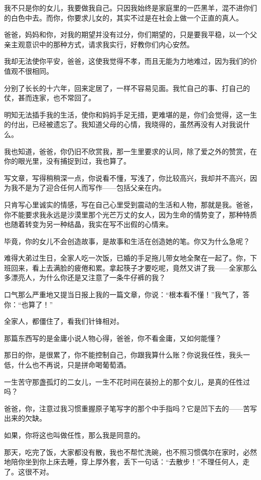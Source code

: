 \par 我不只是你的女儿，我要做我自己。只因我始终是家庭里的一匹黑羊，混不进你们的白色中去。而你，你要求儿女的，其实不过是在社会上做一个正直的真人。
\par 爸爸，妈妈和你，对我的期望并没有过分，你们期望的，只是要我平稳，以一个父亲主观意识中的那种方式，请求我实行，好教你们内心安然。
\par 我却无法使你平安，爸爸，这使我觉得不孝，而且无能为力地难过，因为我们的价值观不很相同。
\par 分别了长长的十六年，回来定居了，一样不容易见面。我忙自己的事、打自己的仗，甚而连家，也不常回了。
\par 明知无法插手我的生活，使你和妈妈手足无措，更难堪的是，你们会觉得，这一生的付出，已经被遗忘了。我知道父母的心情，我晓得的，虽然再没有人对我说什么。
\par 我也知道，爸爸，你仍旧不欣赏我，那一生里要求的认同，除了爱之外的赞赏，在你的眼光里，没有捕捉到过，我也算了。
\par 写文章，写得稍稍深一点，你说看不懂，写浅了，你比较高兴，我却并不高兴，因为我不是为了迎合任何人而写作——包括父亲在内。
\par 只肯写心里诚实的情感，写在自己心里受到震动的生活和人物，那就是我。爸爸，你不能要求我永远是沙漠里那个光芒万丈的女人，因为生命的情势变了，那种特质也随着转变为另一种结晶，我实在写不出假的心情来。
\par 毕竟，你的女儿不会创造故事，是故事和生活在创造她的笔。你又为什么急呢？
\par 难得大弟过生日，全家人吃一次饭，已婚的手足拖儿带女地全聚在一起了。你，下班回来，看上去满脸的疲倦和累。拿起筷子才要吃呢，竟然又讲了我——全家那么多漂亮人，为什么你还是又注意了一条牛仔裤的我？
\par 口气那么严重地又提当日报上我的一篇文章，你说：“根本看不懂！”我气了，答你：“也算了！”
\par 全家人，都僵住了，看我们针锋相对。
\par 那篇东西写的是金庸小说人物心得，爸爸，你不看金庸，又如何能懂？
\par 那日的你，是很累了，你不能控制自己，你跟我算什么账？你说我任性，我头一低，什么也不再说，只是拼命喝葡萄酒。
\par 一生苦守那盏孤灯的二女儿，一生不花时间在装扮上的那个女儿，是真的任性过吗？
\par 爸爸，你，注意过我习惯重握原子笔写字的那个中手指吗？它是凹下去的——苦写出来的欠缺。
\par 如果，你将这也叫做任性，那么我是同意的。
\par 那天，吃完了饭，大家都没有散，我也不帮忙洗碗，也不照习惯偶尔在家时，必然地陪你坐到你上床去睡，穿上厚外套，丢下一句话：“去散步！”不理任何人，走了。这很不对。
